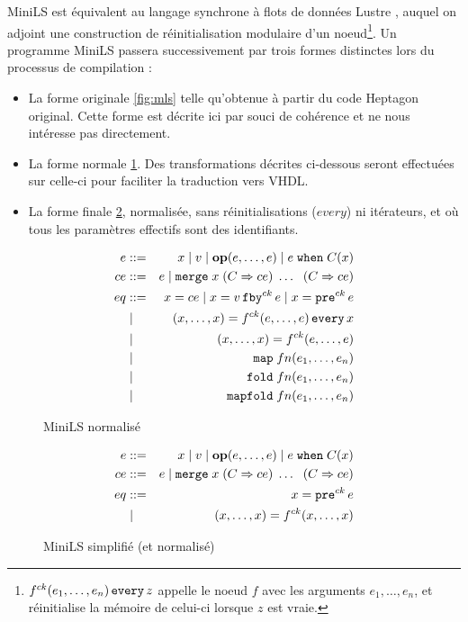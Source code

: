 \documentclass[a4paper]{article}
\newcommand{\LANG}{{\sc Heptagon}}
\newcommand{\p}[0]{\; \vert \;}
\newcommand{\mybox}[1]{\mbox{\tt{#1}}}
\newcommand{\Coloneqq}[0]{::=}
\newcommand{\Op}[2]{\mybox{\bf{op}}(#1,\dots,#2)}
\newcommand{\Fby}[2]{#1 \, \mybox{fby}^{ck} \, #2}
\newcommand{\Pre}[1]{\mybox{pre}^{ck} \, #1}
\newcommand{\Every}[4]{#1^{ck}(#2,\dots,#3) \, \mybox{every} \, #4}
\newcommand{\App}[2]{#1^{ck}(#2)}
\newcommand{\When}[3]{#1 \; \mybox{when} \; #2(#3)}
\newcommand{\Merge}[5]{\mybox{merge} \; #1 \; (#2 \Rightarrow #3) \; \dots \; \
  (#4 \Rightarrow #5)}
\newcommand{\Map}[3]{\mathtt{map} \; #1 n (#2,\dots,#3)}
\newcommand{\Fold}[3]{\mathtt{fold} \; #1 n (#2,\dots,#3)}
\newcommand{\Mapfold}[3]{\mathtt{mapfold} \; #1 n (#2,\dots,#3)}
\begin{document}
MiniLS est \'equivalent au langage synchrone \`a flots de donn\'ees Lustre
\cite{lustre:ieee91}, auquel on adjoint une construction de r\'einitialisation
modulaire d'un noeud\footnote{$\Every{f}{e_1}{e_n}{z}$ appelle le noeud $f$ avec
  les arguments $e_1,\dots,e_n$, et r\'einitialise la m\'emoire de celui-ci
  lorsque $z$ est vraie.}. Un programme MiniLS passera successivement par trois
formes distinctes lors du processus de compilation :

\begin{itemize}
\item La forme originale \ref{fig:mls} telle qu'obtenue \`a partir du code
  \LANG{} original. Cette forme est d\'ecrite ici par souci de coh\'erence et ne
  nous int\'eresse pas directement.
\item La forme normale \ref{fig:mlsn}. Des transformations d\'ecrites ci-dessous
  seront effectu\'ees sur celle-ci pour faciliter la traduction vers VHDL.
\item La forme finale \ref{fig:mlsns}, normalis\'ee, sans r\'einitialisations
  ($every$) ni it\'erateurs, et o\`u tous les param\`etres effectifs sont des
  identifiants.
\end{itemize}

\begin{figure}[htp]
  \centering
  \begin{eqnarray*}
    e & \Coloneqq & x \p v \p \Op{e}{e} \p \When{e}{C}{x} \\
    ce & \Coloneqq & e \p \Merge{x}{C}{ce}{C}{ce} \\
    eq & \Coloneqq & x = ce \p x = \Fby{v}{e} \p x = \Pre{e} \\
    & \p & (x,\dots,x) = \Every{f}{e}{e}{x} \\
    & \p & (x,\dots,x) = \App{f}{e,\dots,e} \\
    & \p & \Map{f}{e_1}{e_n} \\
    & \p & \Fold{f}{e_1}{e_n} \\
    & \p & \Mapfold{f}{e_1}{e_n}
  \end{eqnarray*}
  \caption{MiniLS normalis\'e}
  \label{fig:mlsn}
\end{figure}

\begin{figure}[htp]
  \centering
  \begin{eqnarray*}
    e & \Coloneqq & x \p v \p \Op{e}{e} \p \When{e}{C}{x} \\
    ce & \Coloneqq & e \p \Merge{x}{C}{ce}{C}{ce} \\
    eq & \Coloneqq & x = \Pre{e} \\
    & \p & (x,\dots,x) = \App{f}{x,\dots,x}
  \end{eqnarray*}
  \caption{MiniLS simplifi\'e (et normalis\'e)}
  \label{fig:mlsns}
\end{figure}
\end{document}
